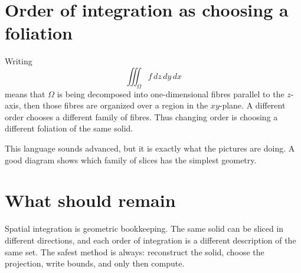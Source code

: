 \section{Order of integration as choosing a foliation}

Writing
\[
  \iiint_{\Omega} f\,dz\,dy\,dx
\]
means that \(\Omega\) is being decomposed into one-dimensional fibres parallel to the \(z\)-axis, then those fibres are organized over a region in the \(xy\)-plane.  A different order chooses a different family of fibres.  Thus changing order is choosing a different foliation of the same solid.

This language sounds advanced, but it is exactly what the pictures are doing.  A good diagram shows which family of slices has the simplest geometry.

\section{What should remain}

Spatial integration is geometric bookkeeping.  The same solid can be sliced in different directions, and each order of integration is a different description of the same set.  The safest method is always: reconstruct the solid, choose the projection, write bounds, and only then compute.
